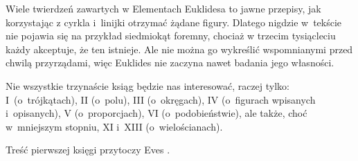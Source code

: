 Wiele twierdzeń zawartych w Elementach Euklidesa to jawne przepisy, jak korzystając z cyrkla i~linijki otrzymać żądane figury.
Dlatego nigdzie w~tekście nie pojawia się na przykład siedmiokąt foremny, chociaż w trzecim tysiącleciu każdy akceptuje, że ten istnieje.
Ale nie można go wykreślić wspomnianymi przed chwilą przyrządami, więc Euklides nie zaczyna nawet badania jego własności.

Nie wszystkie trzynaście ksiąg będzie nas interesować, raczej tylko: I~(o~trójkątach), II (o~polu), III (o~okręgach), IV (o~figurach wpisanych i~opisanych), V (o~proporcjach), VI (o~podobieństwie), ale także, choć w~mniejszym stopniu, XI i~XIII (o~wielościanach).

Treść pierwszej księgi przytoczy Eves \cite[s. 375-379]{eves1_1972}.









%